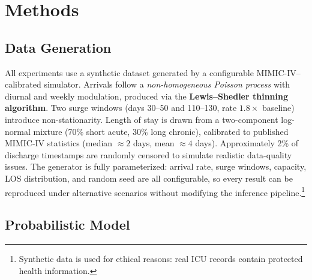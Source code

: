 \documentclass[10pt, twocolumn]{article}
\begin{document}
\section{Methods}

\subsection{Data Generation}

All experiments use a synthetic dataset generated by a configurable
MIMIC-IV--calibrated simulator. Arrivals follow a \emph{non-homogeneous
Poisson process} with diurnal and weekly modulation, produced via the
\textbf{Lewis--Shedler thinning algorithm}. Two surge windows
(days 30--50 and 110--130, rate $1.8\times$ baseline) introduce
non-stationarity. Length of stay is drawn from a two-component
log-normal mixture (70\% short acute, 30\% long chronic), calibrated to
published MIMIC-IV statistics (median $\approx 2$ days,
mean $\approx 4$ days). Approximately 2\% of discharge timestamps are
randomly censored to simulate realistic data-quality issues. The
generator is fully parameterized: arrival rate, surge windows, capacity,
LOS distribution, and random seed are all configurable, so every result
can be reproduced under alternative scenarios without modifying the
inference pipeline.\footnote{Synthetic data is used for ethical reasons:
real ICU records contain protected health information.}

\subsection{Probabilistic Model}
\end{document}
